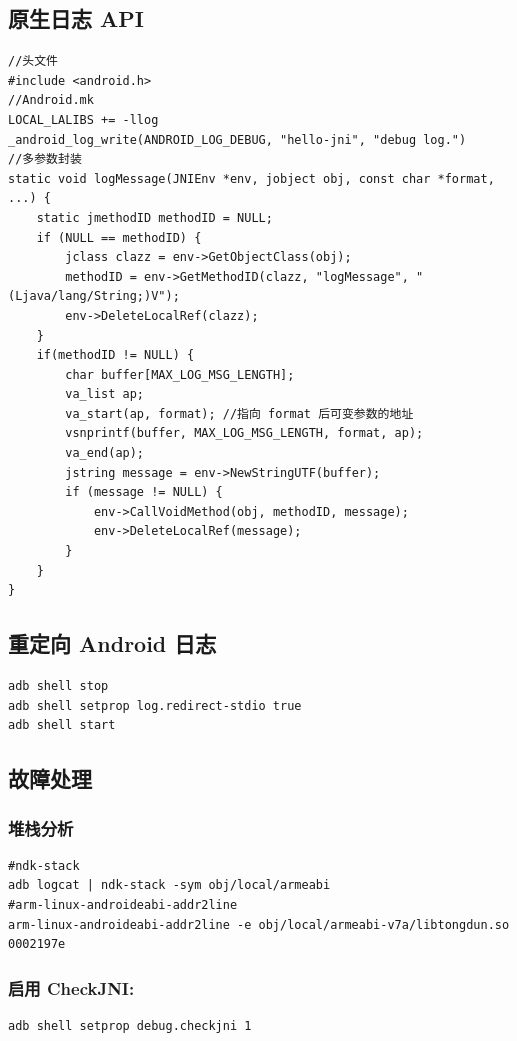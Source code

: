 \documentclass[9pt, b5paper]{article}
\begin{document}
\subsection{原生日志 API}
\label{sec-3-1}
\begin{verbatim}
//头文件
#include <android.h>
//Android.mk
LOCAL_LALIBS += -llog
_android_log_write(ANDROID_LOG_DEBUG, "hello-jni", "debug log.")
//多参数封装
static void logMessage(JNIEnv *env, jobject obj, const char *format, ...) {
    static jmethodID methodID = NULL;
    if (NULL == methodID) {
        jclass clazz = env->GetObjectClass(obj);
        methodID = env->GetMethodID(clazz, "logMessage", "(Ljava/lang/String;)V");
        env->DeleteLocalRef(clazz);
    }
    if(methodID != NULL) {
        char buffer[MAX_LOG_MSG_LENGTH];
        va_list ap;
        va_start(ap, format); //指向 format 后可变参数的地址
        vsnprintf(buffer, MAX_LOG_MSG_LENGTH, format, ap);
        va_end(ap);
        jstring message = env->NewStringUTF(buffer);
        if (message != NULL) {
            env->CallVoidMethod(obj, methodID, message);
            env->DeleteLocalRef(message);
        }
    }
}
\end{verbatim}

\subsection{重定向 Android 日志}
\label{sec-3-2}
\begin{verbatim}
adb shell stop
adb shell setprop log.redirect-stdio true
adb shell start
\end{verbatim}

\subsection{故障处理}
\label{sec-3-3}
\subsubsection{堆栈分析}
\label{sec-3-3-1}
\begin{verbatim}
#ndk-stack
adb logcat | ndk-stack -sym obj/local/armeabi
#arm-linux-androideabi-addr2line
arm-linux-androideabi-addr2line -e obj/local/armeabi-v7a/libtongdun.so 0002197e
\end{verbatim}
\subsubsection{启用 CheckJNI:}
\label{sec-3-3-2}
\begin{verbatim}
adb shell setprop debug.checkjni 1
\end{verbatim}
\end{document}
